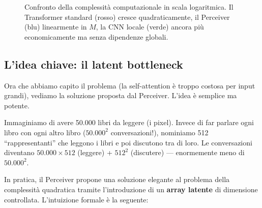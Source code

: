 \documentclass[12pt,a4paper]{article}
\begin{document}
\begin{figure}[H]
\centering
{}
\caption{Confronto della complessit\`a computazionale in scala logaritmica. Il Transformer standard (rosso) cresce quadraticamente, il Perceiver (blu) linearmente in $M$, la CNN locale (verde) ancora pi\`u economicamente ma senza dipendenze globali.}
\label{fig:complexity_comparison}
\end{figure}


\subsection{L'idea chiave: il latent bottleneck} \label{sec:latent_bottleneck}

Ora che abbiamo capito il problema (la self-attention \`e troppo costosa per input grandi), vediamo la soluzione proposta dal Perceiver. L'idea \`e semplice ma potente.

Immaginiamo di avere 50.000 libri da leggere (i pixel). Invece di far parlare ogni libro con ogni altro libro ($50.000^2$ conversazioni!), nominiamo 512 ``rappresentanti'' che leggono i libri e poi discutono tra di loro. Le conversazioni diventano $50.000 \times 512$ (leggere) + $512^2$ (discutere) --- enormemente meno di $50.000^2$.

In pratica, il Perceiver propone una soluzione elegante al problema della complessit\`a quadratica tramite l'introduzione di un \textbf{array latente} di dimensione controllata. L'intuizione formale \`e la seguente:
\end{document}
